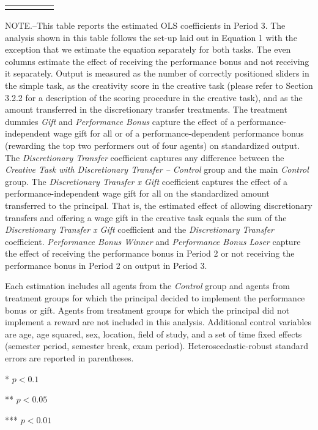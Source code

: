 \begin{table}[h]
\begin{center}
{\begin{tabular}{lcccc}
\hline\noalign{\medskip}
\end{tabular}
\begin{minipage}{\textwidth} \setlength{\parindent}{15pt}
\footnotesize NOTE.--This table reports the estimated OLS coefficients in Period 3. 
The analysis shown in this table follows the set-up laid out in Equation 1 with the exception that we estimate the equation separately for both tasks. 
The even columns estimate the effect of receiving the performance bonus and not receiving it separately. 
Output is measured as the number of correctly positioned sliders in the simple task, as the creativity score in the creative task (please refer to Section 3.2.2 for a description of the scoring procedure in the creative task), and as the amount transferred in the discretionary transfer treatments. 
The treatment dummies \textit{Gift} and \textit{Performance Bonus} capture the effect of a performance-independent wage gift for all or of a performance-dependent performance bonus (rewarding the top two performers out of four agents) on standardized output. 
The \textit{Discretionary Transfer} coefficient captures any difference between the \textit{Creative Task with Discretionary Transfer -- Control} group and the main \textit{Control} group. 
The \textit{Discretionary Transfer x Gift} coefficient captures the effect of a performance-independent wage gift for all on the standardized amount transferred to the principal. 
That is, the estimated effect of allowing discretionary transfers and offering a wage gift in the creative task equals the sum of the \textit{Discretionary Transfer x Gift} coefficient and the \textit{Discretionary Transfer} coefficient. 
\textit{Performance Bonus Winner} and \textit{Performance Bonus Loser} capture the effect of receiving the performance bonus in Period 2 or not receiving the performance bonus in Period 2 on output in Period 3. 

Each estimation includes all agents from the \textit{Control} group and agents from treatment groups for which the principal decided to implement the performance bonus or gift. Agents from treatment groups for which the principal did not implement a reward are not included in this analysis. 
Additional control variables are age, age squared, sex, location, field of study, and a set of time fixed effects (semester period, semester break, exam period). 
Heteroscedastic-robust standard errors are reported in parentheses. 

*   $ p < 0.1  $

**  $ p < 0.05 $

*** $ p < 0.01 $
\end{minipage}}
\end{center}
\label{tab:Period3}
\end{table}
